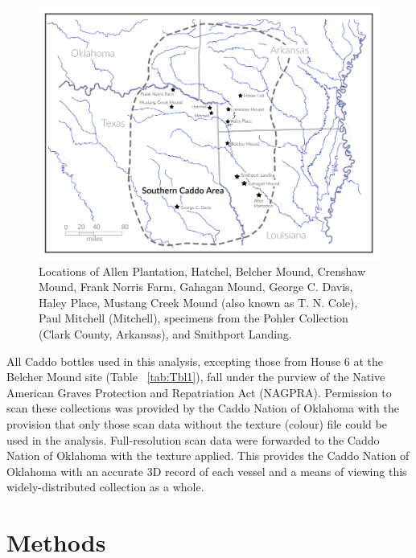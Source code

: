 \documentclass[review]{elsarticle}
\begin{document}
\begin{figure}[ht]\centering
\includegraphics[width=\linewidth]{SCA-HFE}
\caption{Locations of Allen Plantation, Hatchel, Belcher Mound, Crenshaw Mound, Frank Norris Farm, Gahagan Mound, George C. Davis, Haley Place, Mustang Creek Mound (also known as T. N. Cole), Paul Mitchell (Mitchell), specimens from the Pohler Collection (Clark County, Arkansas), and Smithport Landing.}
\label{fig:FigMap}
\end{figure}

All Caddo bottles used in this analysis, excepting those from House 6 at the Belcher Mound site (Table ~\ref{tab:Tbl1}), fall under the purview of the Native American Graves Protection and Repatriation Act (NAGPRA). Permission to scan these collections was provided by the Caddo Nation of Oklahoma with the provision that only those scan data without the texture (colour) file could be used in the analysis. Full-resolution scan data were forwarded to the Caddo Nation of Oklahoma with the texture applied. This provides the Caddo Nation of Oklahoma with an accurate 3D record of each vessel and a means of viewing this widely-distributed collection as a whole.

\section{Methods}
\end{document}

